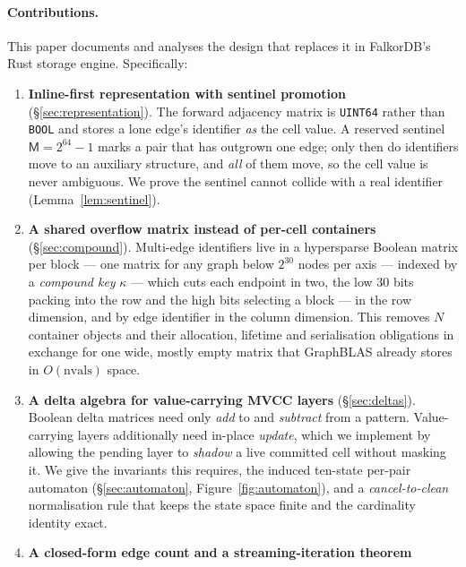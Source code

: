 \documentclass[11pt,a4paper]{article}
\theoremstyle{plain}
\theoremstyle{definition}
\theoremstyle{remark}
\newcommand{\M}{\mathsf{M}}
\begin{document}
\paragraph{Contributions.}
This paper documents and analyses the design that replaces it in FalkorDB's
Rust storage engine. Specifically:

\begin{enumerate}
  \item \textbf{Inline-first representation with sentinel promotion}
        (\S\ref{sec:representation}). The forward adjacency matrix is
        \texttt{UINT64} rather than \texttt{BOOL} and stores a lone edge's
        identifier \emph{as} the cell value. A reserved sentinel
        $\M = 2^{64}-1$ marks a pair that has outgrown one edge; only then do
        identifiers move to an auxiliary structure, and \emph{all} of them
        move, so the cell value is never ambiguous. We prove the sentinel
        cannot collide with a real identifier
        (Lemma~\ref{lem:sentinel}).
  \item \textbf{A shared overflow matrix instead of per-cell
        containers} (\S\ref{sec:compound}). Multi-edge identifiers live in a
        hypersparse \cite{bulucgilbert2008} Boolean matrix per block --- one
        matrix for any graph below $2^{30}$ nodes per axis --- indexed by a
        \emph{compound key} $\kappa$ --- which cuts each endpoint in two,
        the low $30$ bits packing into the row and the high bits selecting a
        block --- in the row dimension, and by edge identifier in the column
        dimension. This
        removes $N$ container objects and their allocation, lifetime and
        serialisation obligations in exchange for one wide, mostly empty
        matrix that GraphBLAS already stores in $O(\mathrm{nvals})$ space.
  \item \textbf{A delta algebra for value-carrying MVCC layers}
        (\S\ref{sec:deltas}). Boolean delta matrices need only
        \emph{add} to and \emph{subtract} from a pattern. Value-carrying
        layers additionally need in-place \emph{update}, which we implement by
        allowing the pending layer to \emph{shadow} a live committed cell
        without masking it. We give the invariants this requires, the induced
        ten-state per-pair automaton
        (\S\ref{sec:automaton}, Figure~\ref{fig:automaton}), and a
        \emph{cancel-to-clean} normalisation rule that keeps the state space
        finite and the cardinality identity exact.
  \item \textbf{A closed-form edge count and a streaming-iteration theorem}

\end{enumerate}
\end{document}
